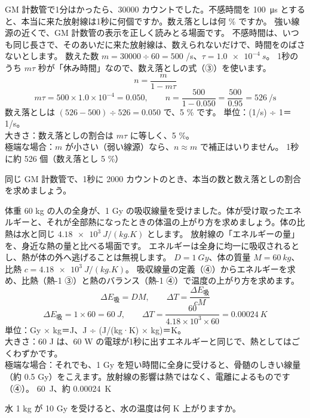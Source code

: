 \label{ph:原-14:ex1}
\begin{phreidai}
GM 計数管で1分はかったら、\num{30000} カウントでした。不感時間を \qty{100}{\micro s} とすると、本当に来た放射線は1秒に何個ですか。数え落としは何 \% ですか。
\phbamen
強い線源の近くで、GM 計数管の表示を正しく読みとる場面です。
\phmushi
不感時間は、いつも同じ長さで、そのあいだに来た放射線は、数えられないだけで、時間をのばさないとします。
\phzu
数えた数 $m=\num{30000}\div60=500$ /s、$\tau=\qty{1.0e-4}{s}$。
\phriyu
1秒のうち $m\tau$ 秒が「休み時間」なので、数え落としの式（③）を使います。
\phtateru
\[ n=\frac{m}{1-m\tau} \]
\phtoku
\[ m\tau=500\times1.0\times10^{-4}=0.050,\qquad n=\frac{500}{1-0.050}=\frac{500}{0.95}=526\ /\text{s} \]
数え落としは $(526-500)\div526=0.050$ で、5 \% です。
\phtashikame
単位：(1/s) ÷ 1＝1/s。\\
大きさ：数え落としの割合は $m\tau$ に等しく、5 \%。\\
極端な場合：$m$ が小さい（弱い線源）なら、$n\approx m$ で補正はいりません。
\kotae 1秒に約 526 個（数え落とし 5 \%）
\end{phreidai}
\begin{jibun}
同じ GM 計数管で、1秒に 2000 カウントのとき、本当の数と数え落としの割合を求めましょう。
\end{jibun}

\label{ph:原-14:ex2}
\begin{phreidai}[1 Gy は、どれくらいのエネルギーか]
体重 60 kg の人の全身が、1 Gy の吸収線量を受けました。体が受け取ったエネルギーと、それが全部熱になったときの体温の上がり方を求めましょう。体の比熱は水と同じ $\qty{4.18e3}{J/(kg.K)}$ とします。
\phbamen
放射線の「エネルギーの量」を、身近な熱の量と比べる場面です。
\phmushi
エネルギーは全身に均一に吸収されるとし、熱が体の外へ逃げることは無視します。
\phzu
$D=\qty{1}{Gy}$、体の質量 $M=\qty{60}{kg}$、比熱 $c=\qty{4.18e3}{J/(kg.K)}$。
\phriyu
吸収線量の定義（④）からエネルギーを求め、比熱（熱-1 ③）と熱のバランス（熱-1 ④）で温度の上がり方を求めます。
\phtateru
\[ \Delta E_{\text{吸}}=DM,\qquad \Delta T=\frac{\Delta E_{\text{吸}}}{cM} \]
\phtoku
\[ \Delta E_{\text{吸}}=1\times60=\qty{60}{J},\qquad \Delta T=\frac{60}{4.18\times10^3\times60}=\qty{0.00024}{K} \]
\phtashikame
単位：Gy × kg＝J、J ÷ (J/(kg·K) × kg)＝K。\\
大きさ：60 J は、60 W の電球が1秒に出すエネルギーと同じで、熱としてはごくわずかです。\\
極端な場合：それでも、1 Gy を短い時間に全身に受けると、骨髄のしきい線量（約 0.5 Gy）をこえます。放射線の影響は熱ではなく、電離によるものです（④）。
\kotae \qty{60}{J}、約 \qty{0.00024}{K}
\end{phreidai}
\begin{jibun}
水 1 kg が 10 Gy を受けると、水の温度は何 K 上がりますか。
\end{jibun}

